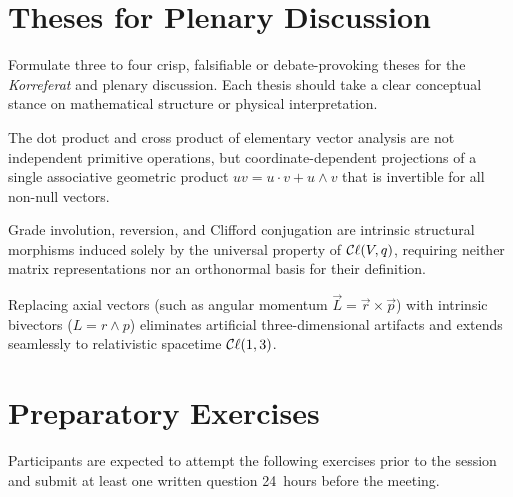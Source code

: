 \documentclass[11pt,a4paper]{article}
\begin{document}
\section{Theses for Plenary Discussion}
\label{sec:theses}

Formulate three to four crisp, falsifiable or debate-provoking theses for the
\emph{Korreferat} and plenary discussion. Each thesis should take a clear
conceptual stance on mathematical structure or physical interpretation.

\begin{thesis}
  The dot product and cross product of elementary vector analysis are not
  independent primitive operations, but coordinate-dependent projections of a
  single associative geometric product $uv = u \cdot v + u \wedge v$ that is
  invertible for all non-null vectors.
\end{thesis}

\begin{thesis}
  Grade involution, reversion, and Clifford conjugation are intrinsic
  structural morphisms induced solely by the universal property of $\mathcal{C}\ell(V,q)$,
  requiring neither matrix representations nor an orthonormal basis for their
  definition.
\end{thesis}

\begin{thesis}
  Replacing axial vectors (such as angular momentum $\vec{L} = \vec{r} \times
  \vec{p}$) with intrinsic bivectors ($L = r \wedge p$) eliminates artificial
  three-dimensional artifacts and extends seamlessly to relativistic
  spacetime $\mathcal{C}\ell(1,3)$.
\end{thesis}

\section{Preparatory Exercises}
\label{sec:exercises}

Participants are expected to attempt the following exercises prior to the
session and submit at least one written question 24~hours before the meeting.
\end{document}
